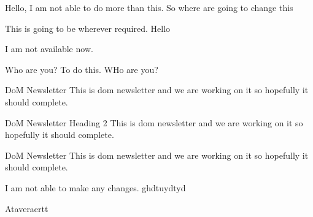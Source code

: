 \documentclass{article}
\begin{document}
Hello, I am not able to do more than this. So where are going to change this

This is going to be wherever required. Hello

I am not available now.

Who are you? To do this. WHo are you?

DoM Newsletter
This is dom newsletter  and we are working on it so hopefully it should complete.

DoM Newsletter Heading 2
This is dom newsletter  and we are working on it so hopefully it should complete.

DoM Newsletter
This is dom newsletter  and we are working on it so hopefully it should complete.

I am not able to make any changes.
ghdtuydtyd


Ataveraertt 
\end{document}
